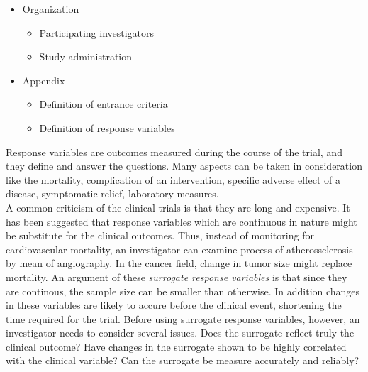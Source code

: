 \documentclass[final, paper=letter,5p,times,twocolumn]{elsarticle}
\theoremstyle{definition}
\begin{document}
\begin{itemize}
\item Organization
  \begin{itemize}
  \item Participating investigators
  \item Study administration
  \end{itemize}

\item Appendix
  \begin{itemize}
  \item Definition of entrance criteria
  \item Definition of response variables
  \end{itemize}
\end{itemize}


Response variables are outcomes measured during the course of the trial, and they define and answer the questions. Many aspects can be taken in consideration like the mortality, complication of an intervention, specific adverse effect of a disease, symptomatic relief, laboratory measures. \\
A common criticism of the clinical trials is that they are long and expensive. It has been suggested that response variables which are continuous in nature might be substitute for the clinical outcomes. Thus, instead of monitoring for cardiovascular mortality, an investigator can examine process of atherossclerosis by mean of angiography. In the cancer field, change in tumor size might replace mortality. An argument of these {\it surrogate response variables} is that since they are continous, the sample size can be smaller than otherwise. In addition changes in these variables are likely to accure before the clinical event, shortening the time required for the trial. Before using surrogate response variables, however, an investigator needs to consider several issues.  Does the surrogate reflect truly the clinical outcome? Have changes in the surrogate shown to be highly correlated with the clinical variable? Can the surrogate be measure accurately and reliably?  \\
\end{document}
